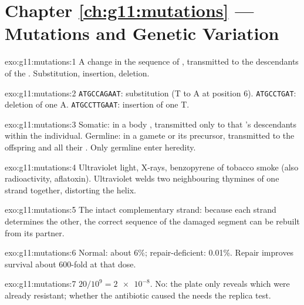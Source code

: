 \section*{Chapter \ref{ch:g11:mutations} --- Mutations and Genetic Variation}

\begin{solution}{exo:g11:mutations:1}
A change in the  sequence of , transmitted to the
descendants of the . Substitution, insertion, deletion.
\end{solution}

\begin{solution}{exo:g11:mutations:2}
\texttt{ATGCCAGAAT}: substitution (T to A at position 6).
\texttt{ATGCCTGAT}: deletion of one A. \texttt{ATGCCTTGAAT}: insertion
of one T.
\end{solution}

\begin{solution}{exo:g11:mutations:3}
Somatic: in a body , transmitted only to that 's descendants
within the individual. Germline: in a gamete or its precursor,
transmitted to the offspring and all their . Only germline
 enter heredity.
\end{solution}

\begin{solution}{exo:g11:mutations:4}
Ultraviolet light, X-rays, benzopyrene of tobacco smoke (also
radioactivity, aflatoxin). Ultraviolet welds two neighbouring thymines
of one strand together, distorting the helix.
\end{solution}

\begin{solution}{exo:g11:mutations:5}
The intact complementary strand: because each strand determines the
other, the correct sequence of the damaged segment can be rebuilt
from its partner.
\end{solution}

\begin{solution}{exo:g11:mutations:6}
Normal: about 6\%; repair-deficient: 0.01\%. Repair improves survival
about 600-fold at that dose.
\end{solution}

\begin{solution}{exo:g11:mutations:7}
$20/10^9 = \num{2e-8}$. No: the plate only reveals which  were
already resistant; whether the antibiotic caused the  needs
the replica test.
\end{solution}

